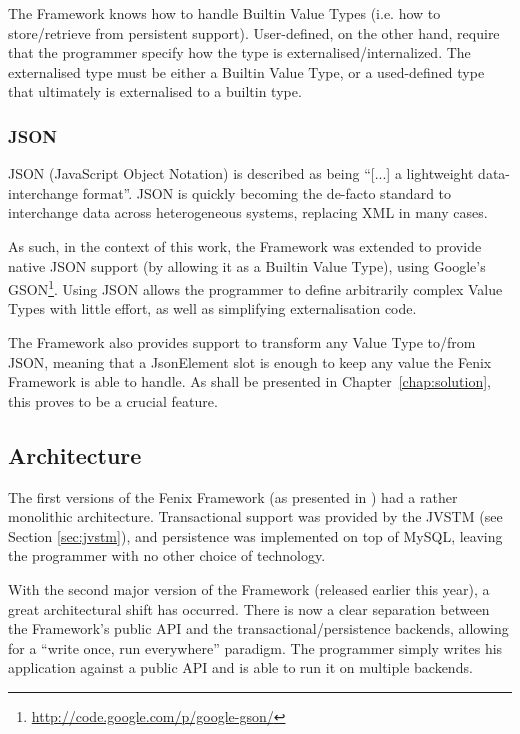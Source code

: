 \documentclass{llncs}
\begin{document}
The Framework knows how to handle Builtin Value Types (i.e. how to
store/retrieve from persistent support). User-defined, on the other
hand, require that the programmer specify how the type is
externalised/internalized. The externalised type must be either a
Builtin Value Type, or a used-defined type that ultimately is
externalised to a builtin type.

\subsubsection{JSON}
\label{sec:json}

JSON (JavaScript Object Notation) is described as being ``[...] a
lightweight data-interchange format''. JSON is quickly becoming the
de-facto standard to interchange data across heterogeneous systems,
replacing XML in many cases.

As such, in the context of this work, the Framework was extended to
provide native JSON support (by allowing it as a Builtin Value Type),
using Google's GSON\footnote{\url{http://code.google.com/p/google-gson/}}.
Using JSON allows the programmer to define arbitrarily complex Value
Types with little effort, as well as simplifying externalisation code.

The Framework also provides support to transform any Value Type
to/from JSON, meaning that a JsonElement slot is enough to keep any
value the Fenix Framework is able to handle. As shall be presented in
Chapter~\ref{chap:solution}, this proves to be a crucial feature.

\subsection{Architecture}
\label{sec:ff-arch}

The first versions of the Fenix Framework (as presented in
\cite{fernandes2011strict}) had a rather monolithic
architecture. Transactional support was provided by the JVSTM (see
Section \ref{sec:jvstm}), and persistence was implemented on top of
MySQL, leaving the programmer with no other choice of technology.

With the second major version of the Framework (released earlier this
year), a great architectural shift has occurred. There is now a clear
separation between the Framework's public API and the
transactional/persistence backends, allowing for a ``write once, run
everywhere'' paradigm. The programmer simply writes his application
against a public API and is able to run it on multiple backends.
\end{document}
